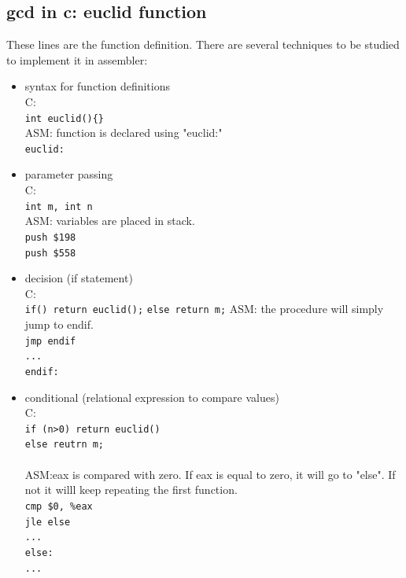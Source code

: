\documentclass{article}
\begin{document}
\subsection{gcd in c: euclid function}

These lines are the function definition. There are several techniques to be studied to implement it in assembler:
\begin{itemize}

\item syntax for function definitions\\
C: \\
\verb|int euclid(){}|\\
ASM: function is declared using "euclid:"\\
\verb|euclid:|\\

\item parameter passing \\
C: \\
\verb|int m, int n|\\
ASM: variables are placed in stack.\\
\verb|push $198|\\
\verb|push $558|\\

\item decision (if statement)\\
C: \\
\verb|if() return euclid();|
\verb|else return m;|
ASM: the procedure will simply jump to endif.\\
\verb|jmp endif|\\
\verb|...|\\
\verb|endif:|\\

\item conditional (relational expression to compare values) \\
C:\\
\verb|if (n>0) return euclid()|\\
\verb|else reutrn m;|\\
\verb||\\
\clearpage
ASM:eax is compared with zero. If eax is equal to zero, it will go to "else". If not it willl keep repeating the first function.\\
\verb|cmp $0, %eax|\\
\verb|jle else|\\
\verb|...|\\
\verb|else:|\\
\verb|...|\\


\end{itemize}
\end{document}
